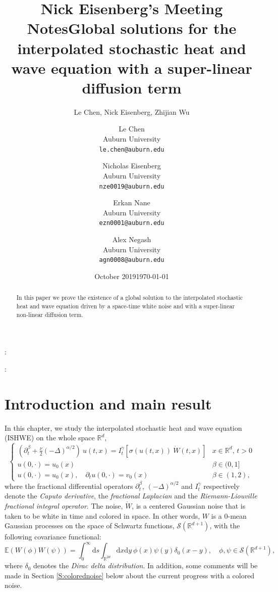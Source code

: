 \documentclass[a4paper,11pt]{article}
\title{Nick Eisenberg's Meeting Notes}
\author{Le Chen, Nick Eisenberg, Zhijian Wu}
\date{October 2019}
\title{Global solutions for the interpolated stochastic heat and wave equation with a super-linear diffusion term}
\author{Le Chen\\Auburn University\\\texttt{le.chen@auburn.edu}\\
	\and
	Nicholas Eisenberg\\Auburn University\\\texttt{nze0019@auburn.edu}
		\and
	Erkan Nane\\Auburn University\\\texttt{ezn0001@auburn.edu}
		\and
	Alex Negash\\Auburn University\\\texttt{agn0008@auburn.edu}
}
\date{\today}
\numberwithin{equation}{section}
\theoremstyle{plain}
\theoremstyle{definition}
\newcommand{\ud}{\ensuremath{\mathrm{d} }}
\newcommand{\R}{\mathbb{R}}
\numberwithin{NQ}{section}
\numberwithin{LQ}{section}
\numberwithin{ZQ}{section}
\begin{document}
\maketitle

\begin{abstract}
In this paper we prove the existence of a global solution to the interpolated stochastic heat and wave equation driven by a space-time white noise and with a super-linear non-linear diffusion term.
\end{abstract}
\bigskip

:
\smallskip

:
\smallskip

\tableofcontents
  \section{Introduction and main result}
  In this chapter, we study the interpolated stochastic heat and wave equation (ISHWE) on the whole
  space $\R^d$,
	\begin{equation} \label{E:SupLinSPDE}
	\begin{cases}
    \left(\partial^\beta_t + \frac{\nu}{2}(-\Delta)^{\alpha/2}\right)\: u(t,x) = I^\gamma_t \left[\sigma( u(t,x)) \: \dot W(t,x) \right] & \text{$x\in \R^d$, $t>0$} \\
    u(0,\cdot) = u_0(x)                                                                                                                  & \beta \in (0,1]           \\
    u(0,\cdot) = u_0(x), \quad \partial_t u(0,\cdot) = v_0(x)                                                                            & \beta \in (1,2),
	\end{cases}
	\end{equation}
  where the fractional differential operators $\partial^\beta_t$, $(-\Delta)^{\alpha/2}$ and
  $I^\gamma_t$ respectively denote the {\em Caputo derivative}, the {\em fractional Laplacian} and
  the {\em Riemann-Liouville fractional integral operator}. The noise, $\dot{W}$, is a centered
  Gaussian noise that is taken to be white in time and colored in space. In other words, $W$ is a
  $0$-mean Gaussian processes on the space of Schwartz functions, $\mathscr{S}(\R^{d+1})$, with the
  following covariance functional:
  \[
    \mathbb{E}\left(W(\phi)W(\psi)\right) = \int_0^\infty \ud s \int_{\R^{2d}} \ud x \ud y \: \phi(x) \psi(y) \delta_0(x-y), \quad \phi, \psi \in \mathscr{S}(\R^{d+1}),
  \]
  where $\delta_0$ denotes the {\em Dirac delta distribution}. In addition, some comments will be
  made in Section \ref{S:colorednoise} below about the current progress with a colored noise.
\end{document}
